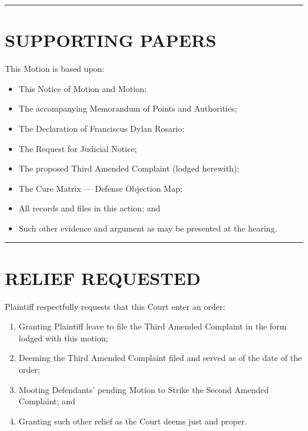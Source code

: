 \begin{center}\rule{0.5\linewidth}{0.5pt}\end{center}

\section{SUPPORTING PAPERS}\label{supporting-papers}

This Motion is based upon:

\begin{itemize}
\tightlist
\item
  This Notice of Motion and Motion;
\item
  The accompanying Memorandum of Points and Authorities;
\item
  The Declaration of Franciscus Dylan Rosario;
\item
  The Request for Judicial Notice;
\item
  The proposed Third Amended Complaint (lodged herewith);
\item
  The Cure Matrix --- Defense Objection Map;
\item
  All records and files in this action; and
\item
  Such other evidence and argument as may be presented at the hearing.
\end{itemize}

\begin{center}\rule{0.5\linewidth}{0.5pt}\end{center}

\section{RELIEF REQUESTED}\label{relief-requested}

Plaintiff respectfully requests that this Court enter an order:

\begin{enumerate}
\def\labelenumi{\arabic{enumi}.}
\item
  Granting Plaintiff leave to file the Third Amended Complaint in the form lodged with this motion;
\item
  Deeming the Third Amended Complaint filed and served as of the date of the order;
\item
  Mooting Defendants' pending Motion to Strike the Second Amended Complaint; and
\item
  Granting such other relief as the Court deems just and proper.
\end{enumerate}

